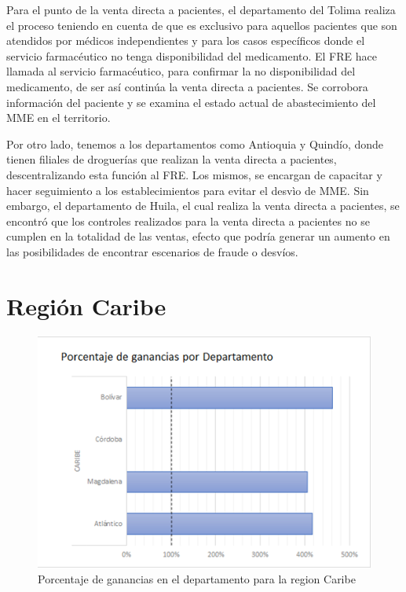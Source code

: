 \documentclass[
]{book}
\begin{document}
Para el punto de la venta directa a pacientes, el departamento del Tolima realiza el proceso teniendo en cuenta de que es exclusivo para aquellos pacientes que son atendidos por médicos independientes y para los casos específicos donde el servicio farmacéutico no tenga disponibilidad del medicamento. El FRE hace llamada al servicio farmacéutico, para confirmar la no disponibilidad del medicamento, de ser así continúa la venta directa a pacientes. Se corrobora información del paciente y se examina el estado actual de abastecimiento del MME en el territorio.

Por otro lado, tenemos a los departamentos como Antioquia y Quindío, donde tienen filiales de droguerías que realizan la venta directa a pacientes, descentralizando esta función al FRE. Los mismos, se encargan de capacitar y hacer seguimiento a los establecimientos para evitar el desvìo de MME. Sin embargo, el departamento de Huila, el cual realiza la venta directa a pacientes, se encontró que los controles realizados para la venta directa a pacientes no se cumplen en la totalidad de las ventas, efecto que podría generar un aumento en las posibilidades de encontrar escenarios de fraude o desvíos.

\hypertarget{regiuxf3n-caribe}{%
\section{Región Caribe}\label{regiuxf3n-caribe}}

\begin{figure}

{\centering \includegraphics[width=0.5\linewidth]{figures/Imagen24} 

}

\caption{Porcentaje de ganancias en el departamento para la region Caribe}\label{fig:porcentajeGananciasRegionCaribe}
\end{figure}
\end{document}
